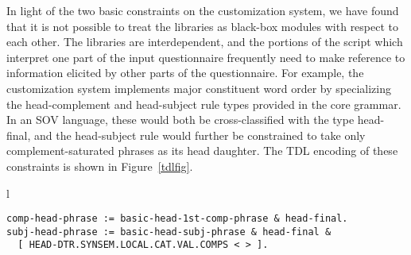 \documentclass[11pt]{article}
\begin{document}
In light of the two basic constraints on the customization system, we
have found that it is not possible to treat the libraries as black-box
modules with respect to each other.  The libraries are interdependent,
and the portions of the script which interpret one part of the input
questionnaire frequently need to make reference to information
elicited by other parts of the questionnaire.  For example, the
customization system implements major constituent word order by
specializing the head-complement and head-subject rule types provided
in the core grammar.  In an SOV language, these would both be
cross-classified with the type head-final, and the head-subject rule
would further be constrained to take only complement-saturated phrases
as its head daughter.  The TDL encoding of these constraints is shown
in Figure~\ref{tdlfig}.

\begin{figure*}[ht]
\small
\begin{center}
\begin{tabular}{l}
\begin{minipage}{5in}
\begin{verbatim}
comp-head-phrase := basic-head-1st-comp-phrase & head-final.
subj-head-phrase := basic-head-subj-phrase & head-final &
  [ HEAD-DTR.SYNSEM.LOCAL.CAT.VAL.COMPS < > ].
\end{verbatim}
\end{minipage}\\
\end{tabular}
\end{center}
\caption{Specialized phrase structure rule types for SOV language}
\label{tdlfig}
\end{figure*}
\end{document}
